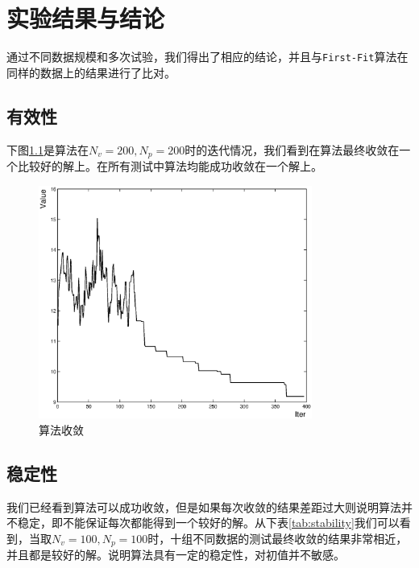 
\chapter{实验结果与结论}
\label{chap:result}
通过不同数据规模和多次试验，我们得出了相应的结论，并且与\texttt{First-Fit}算法在同样的数据上的结果进行了比对。

\section{有效性}
下图\ref{fig:feas}是算法在$N_v = 200,N_p = 200$时的迭代情况，我们看到在算法最终收敛在一个比较好的解上。在所有测试中算法均能成功收敛在一个解上。
\begin{figure}[htbp]
\centering %
\includegraphics[width=0.8\textwidth]{figures/feasibility.eps}
\caption{算法收敛} \label{fig:feas}
\end{figure}
\section{稳定性}
我们已经看到算法可以成功收敛，但是如果每次收敛的结果差距过大则说明算法并不稳定，即不能保证每次都能得到一个较好的解。从下表\ref{tab:stability}我们可以看到，当取$N_v = 100, N_p = 100$时，十组不同数据的测试最终收敛的结果非常相近，并且都是较好的解。说明算法具有一定的稳定性，对初值并不敏感。

